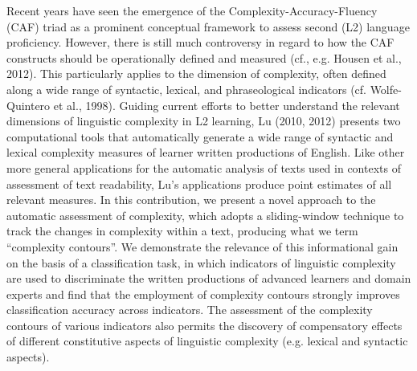 \documentclass[10pt, a4paper, twopage, headinclude, footinclude, BCOR5mm]{book}
\begin{document}
\begin{table}[t!]
\end{table} 
\begin{table}[t!]
\end{table} 
\noindent
Recent years have seen the emergence of the Complexity-Accuracy-Fluency (CAF) triad as a prominent conceptual framework to assess second (L2) language proficiency. However, there is still much controversy in regard to how the CAF constructs should be operationally defined and measured (cf., e.g. Housen et al., 2012). This particularly applies to the dimension of complexity, often defined along a wide range of syntactic, lexical, and phraseological indicators (cf. Wolfe-Quintero et al., 1998). Guiding current efforts to better understand the relevant dimensions of linguistic complexity in L2 learning, Lu (2010, 2012) presents two computational tools that automatically generate a wide range of syntactic and lexical complexity measures of learner written productions of English. Like other more general applications for the automatic analysis of texts used in contexts of assessment of text readability, Lu’s applications produce point estimates of all relevant measures. In this contribution, we present a novel approach to the automatic assessment of complexity, which adopts a sliding-window technique to track the changes in complexity within a text, producing what we term “complexity contours”. We demonstrate the relevance of this informational gain on the basis of a classification task, in which indicators of linguistic complexity are used to discriminate the written productions of advanced learners and domain experts and find that the employment of complexity contours strongly improves classification accuracy across indicators. The assessment of the complexity contours of various indicators also permits the discovery of compensatory effects of different constitutive aspects of linguistic complexity (e.g. lexical and syntactic aspects).   
\end{document}
